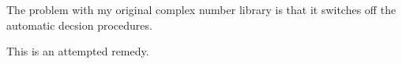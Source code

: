The problem with my original complex number library is that it
switches off the automatic decsion procedures.

This is an attempted remedy.
